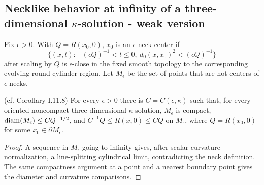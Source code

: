 \subsection{Necklike behavior at infinity of a three-dimensional $\kappa$-solution - weak version}
\begin{definition}
\label{def:kl-necklike-behavior-at-infinity-three-dimensional-solution-weak-version-kappa-solution-definition}


Fix $\epsilon>0$.  With $Q=R(x_0,0)$, $x_0$ is an $\epsilon$-neck center if
\[
\{(x,t):-(\epsilon Q)^{-1}<t\leq0,\ d_0(x,x_0)^2<(\epsilon Q)^{-1}\}
\]
after scaling by $Q$ is $\epsilon$-close in the fixed smooth topology to
the corresponding evolving round-cylinder region.  Let $M_\epsilon$ be the
set of points that are not centers of $\epsilon$-necks.
\end{definition}
\begin{corollary}
\label{cor:kl-necklike-behavior-at-infinity-three-dimensional-solution-weak-version-existence-kappa-solutions}

(cf. Corollary I.11.8) \label{corI.11.8}
For every $\epsilon>0$ there is $C=C(\epsilon,\kappa)$ such that, for every
oriented noncompact three-dimensional $\kappa$-solution, $M_\epsilon$ is
compact, $\operatorname{diam}(M_\epsilon)\leq CQ^{-1/2}$, and
$C^{-1}Q\leq R(x,0)\leq CQ$ on $M_\epsilon$, where
$Q=R(x_0,0)$ for some $x_0\in\partial M_\epsilon$.
\end{corollary}
\begin{proof}
\sketch A sequence in $M_\epsilon$ going to infinity gives, after scalar
curvature normalization, a line-splitting cylindrical limit, contradicting
the neck definition.  The same compactness argument at a point and a nearest
boundary point gives the diameter and curvature comparisons.
\end{proof}

